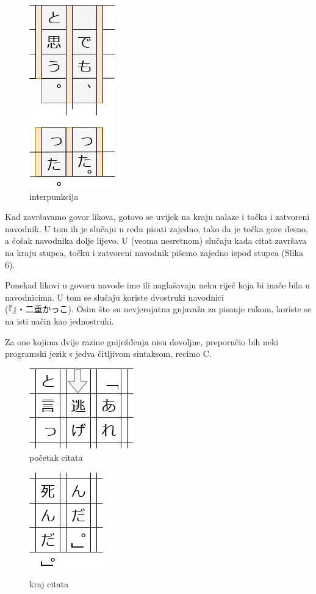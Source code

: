 	\begin{figure}
		\centering
		\includegraphics[width=.15\textwidth]{017_pisanje_res/a5.png}
		\caption{interpunkcija}
	\end{figure}

	Kad završavamo govor likova, gotovo se uvijek na kraju nalaze i točka i zatvoreni navodnik. U tom ih je slučaju u redu pisati zajedno, tako da je točka gore desno, a ćošak navodnika dolje lijevo. U (veoma nesretnom) slučaju kada citat završava na kraju stupca, točku i zatvoreni navodnik pišemo zajedno ispod stupca (Slika 6).
	
	Ponekad likovi u govoru navode ime ili naglašavaju neku riječ koja bi inače bila u navodnicima. U tom se slučaju koriste dvostruki navodnici\\ (『』・二重かっこ). Osim što su nevjerojatna gnjavaža za pisanje rukom, koriste se na isti način kao jednostruki.
	
	Za one kojima dvije razine gniježđenja nisu dovoljne, preporučio bih neki programski jezik s jedva čitljivom sintaksom, recimo C.
	
	\begin{figure}
		\centering
		\includegraphics[width=.2\textwidth]{017_pisanje_res/b1.png}
		\caption{početak citata}
	\end{figure}
	\begin{figure}
		\centering
		\includegraphics[width=.16\textwidth]{017_pisanje_res/b2.png}
		\caption{kraj citata}
	\end{figure}

